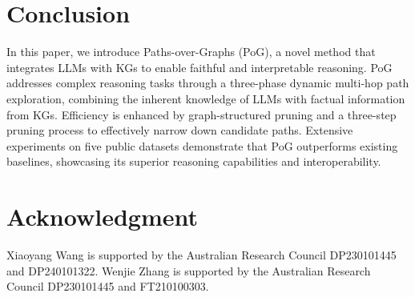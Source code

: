\section{Conclusion}
\label{sec:7_conc}



In this paper, we introduce Paths-over-Graphs (PoG), a novel method that integrates LLMs with KGs to enable faithful and interpretable reasoning. PoG addresses complex reasoning tasks through a three-phase dynamic multi-hop path exploration, combining the inherent knowledge of LLMs with factual information from KGs. Efficiency is enhanced by graph-structured pruning and a three-step pruning process to effectively narrow down candidate paths. Extensive experiments on five public datasets demonstrate that PoG outperforms existing baselines, showcasing its superior reasoning capabilities and interoperability. 

\section{Acknowledgment}
Xiaoyang Wang is supported by the Australian Research Council DP230101445 and DP240101322. Wenjie Zhang is supported by the Australian Research Council DP230101445 and FT210100303.



